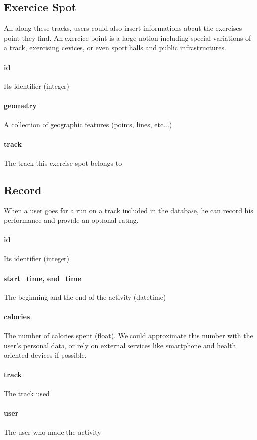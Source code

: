 \documentclass[a4paper]{article}
\begin{document}
\subsection{Exercice Spot}
All along these tracks, users could also insert informations about the exercises
point they find. An exercice point is a large notion including special variations
of a track, exercising devices, or even sport halls and public infrastructures.

\paragraph{id} Its identifier (integer)
\paragraph{geometry} A collection of geographic features (points, lines, etc...)
\paragraph{track} The track this exercise spot belongs to


\subsection{Record}
When a user goes for a run on a track included in the database, he can record his
performance and provide an optional rating.

\paragraph{id} Its identifier (integer)
\paragraph{start\_time, end\_time} The beginning and the end of the activity (datetime)
\paragraph{calories} The number of calories spent (float). We could approximate this number with the user's personal data, or rely on external services like smartphone and health oriented devices if possible.
\paragraph{track} The track used
\paragraph{user} The user who made the activity
\end{document}
